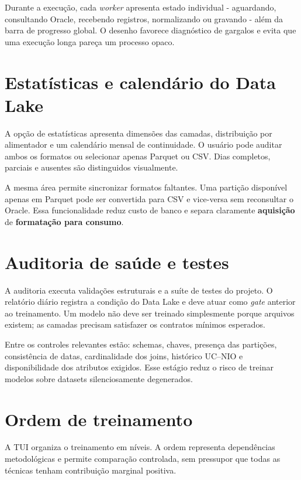 Durante a execução, cada \emph{worker} apresenta estado individual - aguardando, consultando Oracle, recebendo registros, normalizando ou gravando - além da barra de progresso global. O desenho favorece diagnóstico de gargalos e evita que uma execução longa pareça um processo opaco.

\section{Estatísticas e calendário do Data Lake}\label{estatuxedsticas-e-calenduxe1rio-do-data-lake}

A opção de estatísticas apresenta dimensões das camadas, distribuição por alimentador e um calendário mensal de continuidade. O usuário pode auditar ambos os formatos ou selecionar apenas Parquet ou CSV. Dias completos, parciais e ausentes são distinguidos visualmente.

A mesma área permite sincronizar formatos faltantes. Uma partição disponível apenas em Parquet pode ser convertida para CSV e vice-versa sem reconsultar o Oracle. Essa funcionalidade reduz custo de banco e separa claramente \textbf{aquisição} de \textbf{formatação para consumo}.

\section{Auditoria de saúde e testes}\label{auditoria-de-sauxfade-e-testes}

A auditoria executa validações estruturais e a suíte de testes do projeto. O relatório diário registra a condição do Data Lake e deve atuar como \emph{gate} anterior ao treinamento. Um modelo não deve ser treinado simplesmente porque arquivos existem; as camadas precisam satisfazer os contratos mínimos esperados.

Entre os controles relevantes estão: schemas, chaves, presença das partições, consistência de datas, cardinalidade dos joins, histórico UC--NIO e disponibilidade dos atributos exigidos. Esse estágio reduz o risco de treinar modelos sobre datasets silenciosamente degenerados.

\section{Ordem de treinamento}\label{ordem-de-treinamento}

A TUI organiza o treinamento em níveis. A ordem representa dependências metodológicas e permite comparação controlada, sem pressupor que todas as técnicas tenham contribuição marginal positiva.


